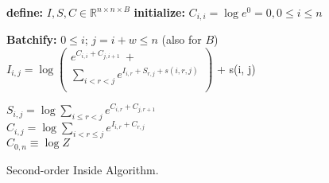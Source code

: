 \documentclass{article}
\date{\today}
\begin{document}
\begin{algorithm}[tb]
\begin{algorithmic}[1]
\newlength{\commentindent}
\setlength{\commentindent}{.2\textwidth}
\renewcommand{\algorithmiccomment}[1]{\unskip\hfill\makebox[\commentindent][l]{$\rhd$~#1}\par}
\LetLtxMacro{\oldalgorithmic}{\algorithmic}
\renewcommand{\algorithmic}[1][0]{%
  \oldalgorithmic[#1]%
  \renewcommand{\ALC@com}[1]{%
  \ifnum\pdfstrcmp{##1}{default}=0\else\algorithmiccomment{##1}\fi}%
}
\begin{footnotesize}
\STATE \textbf{define:} $I,S,C \in \mathbb{R}^{n \times n \times B}$ 
\STATE \textbf{initialize:} $C_{i, i} = \log e^0 = 0, 0 \le i \le n$

  \STATE \textbf{Batchify:} $0 \le i$; $j=i+w \le n$ (also for $B$)
  \STATE
    $I_{i, j} = \log\left(
      \begin{array}{l}
        e^{C_{i, i}  +  C_{j, i+1}} ~ + \\
      \sum\limits_{i < r < j} e^{I_{i, r} + S_{r, j}
      + s(i, r, j)} \\

      \end{array}
      \right)$ + s(i, j)


  \STATE $S_{i, j} = \log \sum\limits_{i \le r < j} e^{C_{i, r}  +  C_{j, r+1}} $ \\
  \STATE $C_{i, j} = \log
    \sum\limits_{i < r \le j} e^{I_{i, r}  +  C_{r, j}}  $ \\
\ENDFOR
\RETURN $C_{0, n} \equiv \log Z$
\end{footnotesize}
\end{algorithmic}
\caption{Second-order Inside Algorithm.}
\label{alg:eisner-2o}
\end{algorithm}
\end{document}
